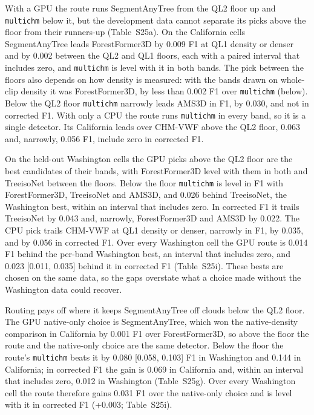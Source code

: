 \documentclass[10pt]{article}
\begin{document}
With a GPU the route runs SegmentAnyTree from the QL2 floor up and \texttt{multichm}
below it, but the development data cannot separate its picks above the floor
from their runners-up (Table~S25a). On the California cells SegmentAnyTree leads
ForestFormer3D by 0.009 F1 at QL1 density or denser and by 0.002 between the QL2
and QL1 floors, each with a paired interval that includes zero, and \texttt{multichm}
is level with it in both bands. The pick between the floors also depends on how
density is measured: with the bands drawn on whole-clip density it was
ForestFormer3D, by less than 0.002 F1 over \texttt{multichm} (below). Below the
QL2 floor \texttt{multichm} narrowly leads AMS3D in F1, by 0.030, and not in corrected
F1. With only a CPU the route runs \texttt{multichm} in every band, so it is a single
detector. Its California leads over CHM-VWF above the QL2 floor, 0.063 and,
narrowly, 0.056 F1, include zero in corrected F1.

On the held-out Washington cells the GPU picks above the QL2 floor are the best
candidates of their bands, with ForestFormer3D level with them in both and
TreeisoNet between the floors. Below the floor \texttt{multichm} is level in F1 with
ForestFormer3D, TreeisoNet and AMS3D, and 0.026 behind TreeisoNet, the
Washington best, within an interval that includes zero. In corrected F1 it
trails TreeisoNet by 0.043 and, narrowly, ForestFormer3D and AMS3D by 0.022. The
CPU pick trails CHM-VWF at QL1 density or denser, narrowly in F1, by 0.035, and
by 0.056 in corrected F1. Over every Washington cell the GPU route is 0.014 F1
behind the per-band Washington best, an interval that includes zero, and 0.023
[0.011, 0.035] behind it in corrected F1 (Table~S25i). These bests are chosen on
the same data, so the gaps overstate what a choice made without the Washington
data could recover.

Routing pays off where it keeps SegmentAnyTree off clouds below the QL2 floor.
The GPU native-only choice is SegmentAnyTree, which won the native-density
comparison in California by 0.001 F1 over ForestFormer3D, so above the floor the
route and the native-only choice are the same detector. Below the floor the
route's \texttt{multichm} beats it by 0.080 [0.058, 0.103] F1 in Washington and 0.144
in California; in corrected F1 the gain is 0.069 in California and, within an
interval that includes zero, 0.012 in Washington (Table~S25g). Over every
Washington cell the route therefore gains 0.031 F1 over the native-only choice
and is level with it in corrected F1 (+0.003; Table~S25i).
\end{document}
